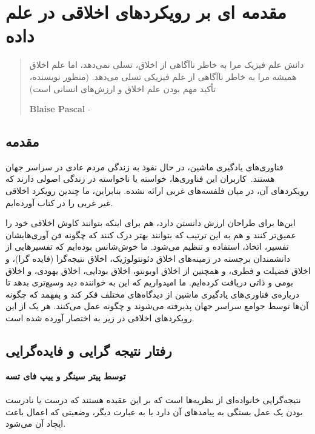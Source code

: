 

\chapter{مقدمه ای بر رویکردهای اخلاقی در علم داده}
\label{ch:مقدمه ای بر رویکردهای اخلاقی در علم داده}

\begin{quote}
    دانش علم فیزیک مرا به خاطر ناآگاهی از اخلاق، تسلی نمی‌دهد، اما علم اخلاق همیشه مرا به خاطر ناآگاهی از علم فیزیکی تسلی می‌دهد.
    (منظور نویسنده، تأکید مهم بودن علم اخلاق و ارزش‌های انسانی است)
    \begin{flushleft}
        \textenglish{\textbf{Blaise Pascal} -}
    \end{flushleft}
\end{quote}

{
\section*{مقدمه}
\label{sec:مقدمه}
فناوری‌های یادگیری ماشین، در حال نفوذ به زندگی مردم عادی در سراسر جهان هستند.\     كاربران اين فناوری‌ها، خواسته یا ناخواسته در زندگی اصولی دارند که رویکردهای آن، در میان فلفسه‌های غربی ارائه نشده.
بنابراین، ما چندین رویکرد اخلاقی غیر غربی را در کتاب آورده‌ایم.
}

این‌ها برای طراحان ارزش دانستن دارد، هم برای اینکه بتوانند کاوش اخلاقی خود را عمیق‌تر کنند و هم به این ترتیب که بتوانند بهتر درک کنند که چگونه فن آوری‌هایشان تفسیر، اتخاذ، استفاده و تنظیم می‌شود.
ما خوش‌شانس بوده‌ایم که تفسیرهایی از دانشمندان برجسته در زمینه‌های اخلاق دئونتولوژیک، اخلاق نتیجه‌گرا (فایده گرا)، و اخلاق فضیلت و فطری، و همچنین از اخلاق اوبونتو، اخلاق بودایی، اخلاق یهودی، و اخلاق بومی و ذاتی دریافت کرده‌ایم.
ما امیدواریم که این به خواننده دید وسیع‌تری بدهد تا درباره‌ی فناوری‌های یادگیری ماشین از دیدگاه‌های مختلف فکر کند و بفهمد که چگونه آن‌ها توسط جوامع سراسر جهان پذیرفته می‌شوند و چگونه عمل می‌کنند.
هر یک از این رویکردهای اخلاقی در زیر به اختصار آورده شده است.


{
\section*{رفتار نتیجه گرایی و فایده‌گرایی}
\label{sec:رفتار نتیجه گرایی و فایده‌گرایی}
\textbf{توسط پیتر سینگر و ییپ فای تسه}
\\\\
نتیجه‌گرایی خانواده‌ای از نظریه‌ها است که بر این عقیده هستند که درست یا نادرست بودن یک عمل بستگی به پیامدهای آن دارد یا به عبارت دیگر، وضعیتی که اعمال باعث ایجاد آن می‌شود.
}
